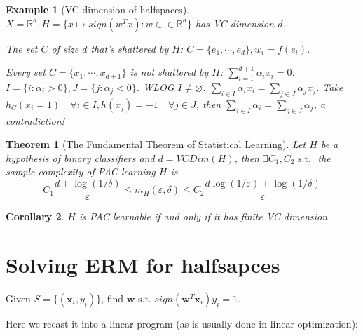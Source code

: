 \documentclass{book}
\newcommand{\R}{\mathbb{R}}
\newcommand{\st}{\text{ s.t. }}
\newtheorem{Thm}{Theorem}[section]
\newtheorem{Cor}[Thm]{Corollary}
\newtheorem{Eg}{Example}[section]
\begin{document}
\begin{Eg}[VC dimension of halfspaces]
  $X=\R^{d},H=\{x\mapsto sign(w^{T}x):w\in \in\R^{d}\}$ has VC dimension $d$.

  The set $C$ of size $d$ that's shattered by $H$: $C=\{e_{1},\cdots,e_{d}\}, w_{i}=f(e_{i})$.

  Every set $C=\{x_{1},\cdots,x_{d+1}\}$ is not shattered by $H$: $\sum_{i=1}^{d+1}\alpha_{i}x_{i}=0$. $I=\{i:\alpha_{i}>0\}, J=\{j:\alpha_{j}<0\}$. WLOG $I\neq \varnothing$. $\sum_{i\in I} \alpha_{i}x_{i}=\sum_{j\in J}\alpha_{j}x_{j}$. Take $h_{C}(x_{i}=1)\quad \forall i\in I, h(x_{j})=-1\quad \forall j\in J$, then $\sum_{i\in I}\alpha_{i}=\sum_{j\in J}\alpha_{j}$, a contradiction!
\end{Eg}
  \begin{Thm}[The Fundamental Theorem of Statistical Learning]
    Let $H$ be a hypothesis of binary classifiers and $d=VCDim(H)$, then $\exists C_{1},C_{2}\st$ the sample complexity of PAC learning $H$ is
    \[C_{1}\frac{d+\log(1/\delta)}{\varepsilon}\leq m_{H}(\varepsilon,\delta)\leq C_{2}\frac{d\log(1/\varepsilon)+\log(1/\delta)}{\varepsilon}\]
  \end{Thm}

\begin{Cor}
  $H$ is PAC learnable if and only if it has finite VC dimension.
\end{Cor}

\begin{comment}
\begin{proof}
  \textbf{lower bound}

  \textbf{upper bound:}
  \begin{enumerate}
  \item \textbf{step 1: the two samples trick}

    Claim: $P_{s\sim D^{m}}[\exists h\in H_{B}:L_{S}=0]\leq 2P_{S,T\sim D^{m}}[\exists h\in H:L_{S}(h)=0, L_{T}(h)\geq\frac{\varepsilon}{2}]$
  \item 
  \end{enumerate}
\end{proof}
\end{comment}

\section{Solving ERM for halfsapces}
Given $S=\{(\bm x_{i},y_{i})\}$, find $\bm w\st sign(\bm w^{T}\bm x_{i})y_{i}=1$.

Here we recast it into a linear program (as is usually done in linear optimization):
\end{document}
